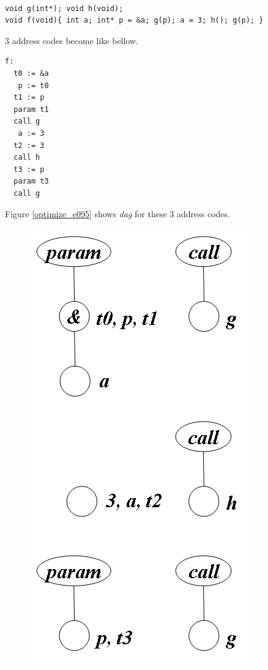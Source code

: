 \begin{Example}
\label{optimize_e094}
\begin{verbatim}

void g(int*); void h(void);
void f(void){ int a; int* p = &a; g(p); a = 3; h(); g(p); }
\end{verbatim}
3 address codes become like bellow.
\begin{verbatim}
f:
  t0 := &a
   p := t0
  t1 := p
  param t1
  call g
   a := 3
  t2 := 3
  call h
  t3 := p
  param t3
  call g
\end{verbatim}
Figure \ref{optimize_e095} shows {\em dag} for these 3 address codes.
\begin{figure}[htbp]
\begin{center}
\begin{htmlonly}
\includegraphics[width=0.496\linewidth,height=1.0\linewidth]{opt041.png}
\end{htmlonly}
\begin{latexonly}

\end{latexonly}
\end{center}
\end{figure}
\end{Example}
